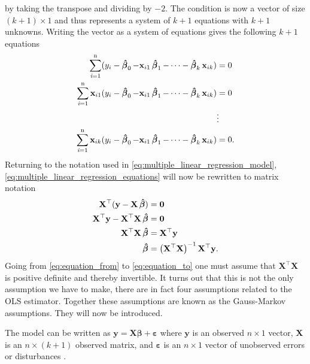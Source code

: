 by taking the transpose and dividing by $-2$.
The condition is now a vector of size $(k + 1) \times 1$ and thus represents a system of $k + 1$ equations with $k + 1$ unknowns.
Writing the vector as a system of equations gives the following $k + 1$ equations
\begin{align}\label{eq:multiple_linear_regression_equations}
\begin{split}
    \operatorname{\sum_{\textit{i}=1}^n} (y_i - \operatorname{\boldsymbol{\hat{\beta}}}_0 -  \mathbf{x}_{i1} \operatorname{\boldsymbol{\hat{\beta}}}_1 - \cdots - \operatorname{\boldsymbol{\hat{\beta}}}_k \mathbf{x}_{ik}) &= 0 \\
    \operatorname{\sum_{\textit{i}=1}^n} \mathbf{x}_{i1}(y_i - \operatorname{\boldsymbol{\hat{\beta}}}_0 -  \mathbf{x}_{i1} \operatorname{\boldsymbol{\hat{\beta}}}_1 - \cdots - \operatorname{\boldsymbol{\hat{\beta}}}_k \mathbf{x}_{ik}) &= 0 \\
    &\vdots \\
    \operatorname{\sum_{\textit{i}=1}^n} \mathbf{x}_{ik}(y_i - \operatorname{\boldsymbol{\hat{\beta}}}_0 -  \mathbf{x}_{i1} \operatorname{\boldsymbol{\hat{\beta}}}_1 - \cdots - \operatorname{\boldsymbol{\hat{\beta}}}_k \mathbf{x}_{ik}) &= 0.
\end{split}
\end{align}
Returning to the notation used in \eqref{eq:multiple_linear_regression_model}, \eqref{eq:multiple_linear_regression_equations} will now be rewritten to matrix notation
\begin{align}
    \mathbf{X}^\top(\mathbf{y} - \mathbf{X}\operatorname{\boldsymbol{\hat{\beta}}}) &= \mathbf{0} \nonumber\\
    \mathbf{X}^\top\mathbf{y} - \mathbf{X}^\top\mathbf{X}\operatorname{\boldsymbol{\hat{\beta}}} &= \mathbf{0}\nonumber\\
    \mathbf{X}^\top\mathbf{X}\operatorname{\boldsymbol{\hat{\beta}}} &= \mathbf{X}^\top\mathbf{y}\label{eq:equation_from} \\
    \operatorname{\boldsymbol{\hat{\beta}}} &= \left(\mathbf{X}^\top\mathbf{X}\right)^{-1}\mathbf{X}^\top\mathbf{y}.\label{eq:equation_to}
\end{align}
Going from \eqref{eq:equation_from} to \eqref{eq:equation_to} one must assume that $\mathbf{X}^\top\mathbf{X}$ is positive definite and thereby invertible.
It turns out that this is not the only assumption we have to make, there are in fact four assumptions related to the OLS estimator.
Together these assumptions are known as the Gauss-Markov assumptions. 
They will now be introduced.
\begin{assumption}\label{as:linear_in_the_parameters}
    The model can be written as $\mathbf{y} = \mathbf{X}\boldsymbol{\beta} + \boldsymbol{\varepsilon}$ where $\mathbf{y}$ is an observed $n \times 1$ vector, $\mathbf{X}$ is an $n \times (k + 1)$ observed matrix, and $\boldsymbol{\varepsilon}$ is an $n \times 1$ vector of unobserved errors or disturbances \cite[p. 809]{Wooldridge2012}.
\end{assumption}
